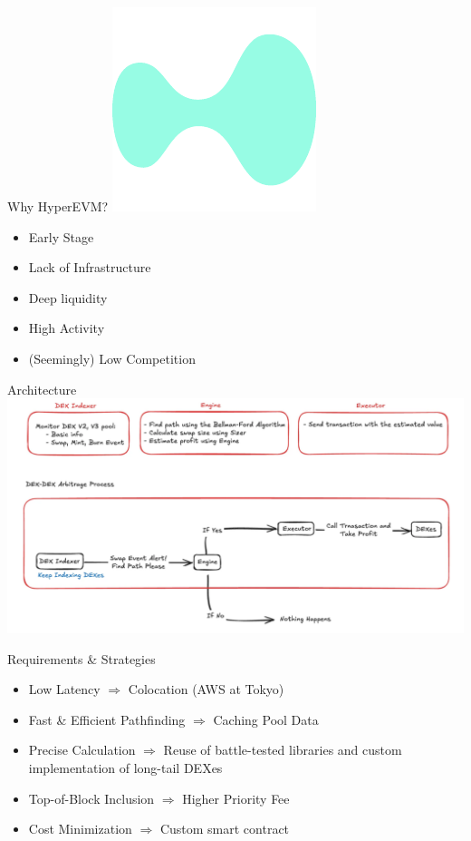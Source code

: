 \documentclass{beamer}
\begin{document}
\begin{frame}{Why HyperEVM?}
  \centering
  \includegraphics[height=0.3\textheight, keepaspectratio]{./images_hl/HL_symbol_mint_green.pdf}
  \begin{itemize}
    \item Early Stage
    \item Lack of Infrastructure
    \item Deep liquidity
    \item High Activity
    \item (Seemingly) Low Competition
  \end{itemize}
\end{frame}

\begin{frame}{Architecture}
  \centering
  \includegraphics[width=\textwidth]{./images_goal_1/orakle_mev_architecture.png}
\end{frame}

\begin{frame}{Requirements \& Strategies}
  \begin{itemize}
    \item Low Latency $\Rightarrow$ Colocation (AWS at Tokyo)
    \item Fast \& Efficient Pathfinding $\Rightarrow$ Caching Pool Data
    \item Precise Calculation $\Rightarrow$ Reuse of battle-tested libraries and custom implementation of long-tail DEXes
    \item Top-of-Block Inclusion $\Rightarrow$ Higher Priority Fee
    \item Cost Minimization $\Rightarrow$ Custom smart contract
  \end{itemize}
\end{frame}
\end{document}
